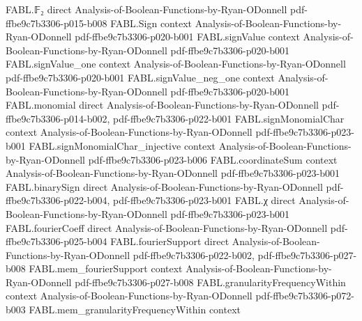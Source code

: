 \begin{theorem}
\label{FABL.exactlyThreeCNF_eval_iff}
\leanok
{}
\proofstep
  {FABL.𝔽₂}
  {direct}
  {Analysis-of-Boolean-Functions-by-Ryan-ODonnell}
  {pdf-ffbe9c7b3306-p015-b008}
\proofstep
  {FABL.Sign}
  {context}
  {Analysis-of-Boolean-Functions-by-Ryan-ODonnell}
  {pdf-ffbe9c7b3306-p020-b001}
\proofstep
  {FABL.signValue}
  {context}
  {Analysis-of-Boolean-Functions-by-Ryan-ODonnell}
  {pdf-ffbe9c7b3306-p020-b001}
\proofstep
  {FABL.signValue_one}
  {context}
  {Analysis-of-Boolean-Functions-by-Ryan-ODonnell}
  {pdf-ffbe9c7b3306-p020-b001}
\proofstep
  {FABL.signValue_neg_one}
  {context}
  {Analysis-of-Boolean-Functions-by-Ryan-ODonnell}
  {pdf-ffbe9c7b3306-p020-b001}
\proofstep
  {FABL.monomial}
  {direct}
  {Analysis-of-Boolean-Functions-by-Ryan-ODonnell}
  {pdf-ffbe9c7b3306-p014-b002,
    pdf-ffbe9c7b3306-p022-b001}
\proofstep
  {FABL.signMonomialChar}
  {context}
  {Analysis-of-Boolean-Functions-by-Ryan-ODonnell}
  {pdf-ffbe9c7b3306-p023-b001}
\proofstep
  {FABL.signMonomialChar_injective}
  {context}
  {Analysis-of-Boolean-Functions-by-Ryan-ODonnell}
  {pdf-ffbe9c7b3306-p023-b006}
\proofstep
  {FABL.coordinateSum}
  {context}
  {Analysis-of-Boolean-Functions-by-Ryan-ODonnell}
  {pdf-ffbe9c7b3306-p023-b001}
\proofstep
  {FABL.binarySign}
  {direct}
  {Analysis-of-Boolean-Functions-by-Ryan-ODonnell}
  {pdf-ffbe9c7b3306-p022-b004,
    pdf-ffbe9c7b3306-p023-b001}
\proofstep
  {FABL.χ}
  {direct}
  {Analysis-of-Boolean-Functions-by-Ryan-ODonnell}
  {pdf-ffbe9c7b3306-p023-b001}
\proofstep
  {FABL.fourierCoeff}
  {direct}
  {Analysis-of-Boolean-Functions-by-Ryan-ODonnell}
  {pdf-ffbe9c7b3306-p025-b004}
\proofstep
  {FABL.fourierSupport}
  {direct}
  {Analysis-of-Boolean-Functions-by-Ryan-ODonnell}
  {pdf-ffbe9c7b3306-p022-b002,
    pdf-ffbe9c7b3306-p027-b008}
\proofstep
  {FABL.mem_fourierSupport}
  {context}
  {Analysis-of-Boolean-Functions-by-Ryan-ODonnell}
  {pdf-ffbe9c7b3306-p027-b008}
\proofstep
  {FABL.granularityFrequencyWithin}
  {context}
  {Analysis-of-Boolean-Functions-by-Ryan-ODonnell}
  {pdf-ffbe9c7b3306-p072-b003}
\proofstep
  {FABL.mem_granularityFrequencyWithin}
  {context}

\end{theorem}
